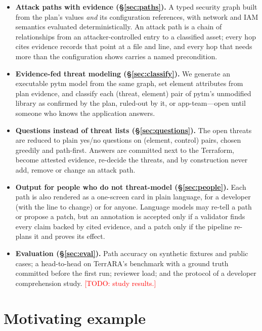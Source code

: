 \documentclass[sigconf,review,anonymous]{acmart}
\newcommand{\todo}[1]{\textcolor{red}{[TODO: #1]}}
\newcommand{\conf}{\textsf{confirmed}\xspace}
\newcommand{\ask}{\textsf{app-team}\xspace}
\newcommand{\ruled}{\textsf{ruled-out}\xspace}
\begin{document}
\begin{itemize}
\item \textbf{Attack paths with evidence (\S\ref{sec:paths}).} A typed security graph built from the plan's values
  \emph{and} its configuration references, with network and IAM semantics evaluated deterministically. An attack path is a
  chain of relationships from an attacker-controlled entry to a classified asset; every hop cites evidence records that point
  at a file and line, and every hop that needs more than the configuration shows carries a named precondition.
\item \textbf{Evidence-fed threat modeling (\S\ref{sec:classify}).} We generate an executable pytm model from the same graph,
  set element attributes from plan evidence, and classify each (threat, element) pair of pytm's unmodified library as
  \conf by the plan, \ruled by it, or \ask---open until someone who knows the application answers.
\item \textbf{Questions instead of threat lists (\S\ref{sec:questions}).} The open threats are reduced to plain yes/no
  questions on (element, control) pairs, chosen greedily and path-first. Answers are committed next to the Terraform, become
  attested evidence, re-decide the threats, and by construction never add, remove or change an attack path.
\item \textbf{Output for people who do not threat-model (\S\ref{sec:people}).} Each path is also rendered as a one-screen
  card in plain language, for a developer (with the line to change) or for anyone. Language models may re-tell a path or
  propose a patch, but an annotation is accepted only if a validator finds every claim backed by cited evidence, and a patch
  only if the pipeline re-plans it and proves its effect.
\item \textbf{Evaluation (\S\ref{sec:eval}).} Path accuracy on \NumTOneFixtures synthetic fixtures and \NumTTwoCases public
  cases; a head-to-head on TerrARA's benchmark with a ground truth committed before the first run; reviewer load; and the
  protocol of a developer comprehension study. \todo{study results.}
\end{itemize}

\section{Motivating example}\label{sec:example}
\end{document}
